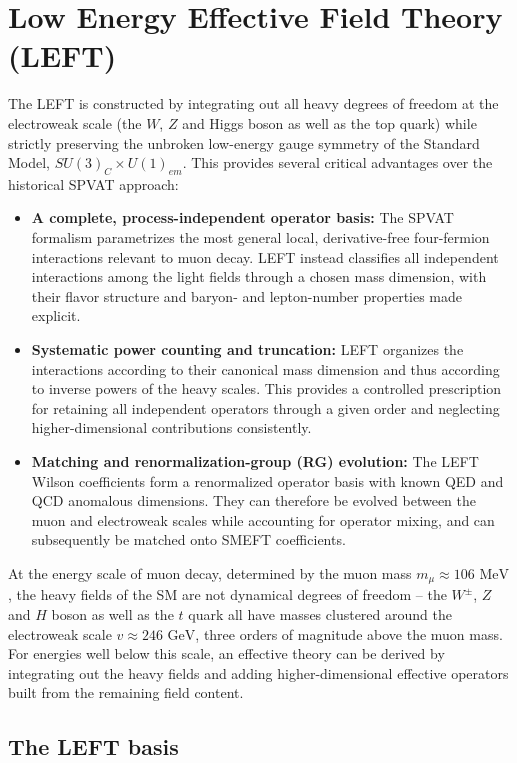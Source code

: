 \chapter{Low Energy Effective Field Theory (LEFT)}\label{ch:left}
The LEFT is constructed by integrating out all heavy degrees of freedom at the electroweak scale (the $W$, $Z$ and Higgs boson as well as the top quark) while strictly preserving the unbroken low-energy gauge symmetry of the Standard Model, $SU(3)_C \times U(1)_{em}$. This provides several critical advantages over the historical SPVAT approach:
\begin{itemize}
    \item \textbf{A complete, process-independent operator basis:}
    The SPVAT formalism parametrizes the most general local,
    derivative-free four-fermion interactions relevant to muon decay. LEFT instead classifies all independent interactions among the light fields through a chosen mass dimension,
    with their flavor structure and baryon- and lepton-number properties made explicit.
    \item \textbf{Systematic power counting and truncation:}
    LEFT organizes the interactions according to their canonical mass
    dimension and thus according to inverse powers of the heavy scales.
    This provides a controlled prescription for retaining all independent
    operators through a given order and neglecting higher-dimensional
    contributions consistently.
    \item \textbf{Matching and renormalization-group (RG) evolution:}
    The LEFT Wilson coefficients form a renormalized operator basis with
    known QED and QCD anomalous dimensions. They can therefore be evolved
    between the muon and electroweak scales while accounting for operator
    mixing, and can subsequently be matched onto SMEFT coefficients.
\end{itemize}
At the energy scale of muon decay, determined by the muon mass $m_\mu \approx 106\text{ MeV}$, the heavy fields of the SM are not dynamical degrees of freedom -- the $W^\pm$, $Z$ and $H$ boson as well as the $t$ quark all have masses clustered around the electroweak scale $v\approx 246\text{ GeV}$, three orders of magnitude above the muon mass. For energies well below this scale, an effective theory can be derived by integrating out the heavy fields and adding higher-dimensional effective operators built from the remaining field content. 

\section{The LEFT basis}
